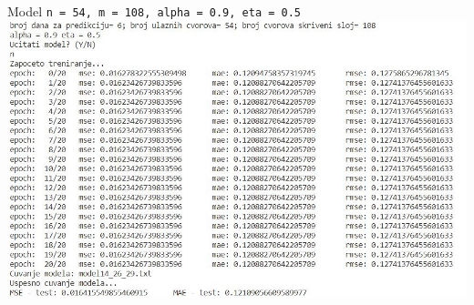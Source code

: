 \documentclass{beamer}
\begin{document}

\begin{frame}{\small{{Model \texttt{n = 54, m = 108, alpha = 0.9, eta = 0.5}}}}
    \includegraphics[scale=0.55]{output/output_example_program_14_26_29.JPG}
\end{frame}
\end{document}
